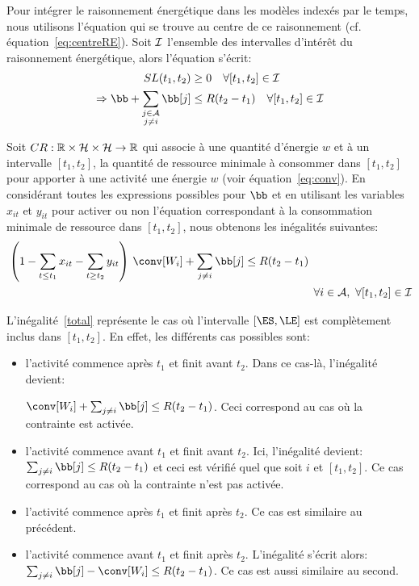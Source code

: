 Pour intégrer le raisonnement énergétique dans les modèles indexés par
le temps, nous utilisons l'équation qui se trouve au centre de ce
raisonnement (cf. équation~\ref{eq:centreRE}). Soit ${\cal I}$ l'ensemble des
intervalles d'intérêt du raisonnement énergétique, alors l'équation
s'écrit:  
\begin{align} 
  SL(t_1,t_2) &\ge 0 \quad \forall [t_1,t_2] \in \I \nonumber\\
  \Rightarrow \bb + \sum_{\substack{j\in \A\\j\neq i}}\bb[j] &\le
  R(t_2-t_1)\quad \forall [t_1,t_2] \in \I \nonumber
\end{align}  

Soit $CR: \mathbb{R} \times {\cal H} \times {\cal H} \rightarrow \mathbb{R}$ qui
associe à une quantité d'énergie $w$ et à un intervalle $[t_1,t_2]$,
la quantité de ressource minimale à consommer dans $[t_1,t_2]$ pour
apporter à une activité une énergie $w$ (voir
équation~\eqref{eq:conv}). En considérant toutes les
expressions possibles pour $\bb$ et en utilisant les variables
$x_{it}$ et $y_{it}$ pour activer ou non l'équation correspondant à la
consommation minimale de ressource dans $[t_1,t_2]$, nous obtenons les
inégalités suivantes: 
\begin{align}
  &\left(1-\sum_{t\le t_1}x_{it} - \sum_{t\ge t_2}y_{it}\right) \, \conv[W_i] +
    \sum_{j\neq i} \bb[j] \le R(t_2-t_1) \nonumber\\
  & \hspace{9.55cm} \forall i \in \A,\ \forall [t_1,t_2] \in \I
    \label{total}
\end{align}

L'inégalité~\eqref{total} représente le cas où l'intervalle
$[\ES,\LE]$ est complètement inclus dans $[t_1,t_2]$. En effet,
les différents cas possibles sont: 
\begin{itemize}
\item l'activité commence après $t_1$ et finit avant $t_2$. Dans ce
  cas-là, l'inégalité devient: 

$\conv[W_i] +\sum_{j\neq i} \bb[j] \le
  R(t_2-t_1)$. Ceci correspond au cas où la contrainte est activée. 
\item l'activité commence avant $t_1$ et finit avant $t_2$. Ici,
  l'inégalité devient: $\sum_{j\neq i} \bb[j] \le R(t_2-t_1)$ et ceci
  est vérifié quel que soit $i$ et $[t_1,t_2]$. Ce cas correspond au
  cas où la contrainte n'est pas activée. 
\item l'activité commence après $t_1$ et finit après $t_2$. Ce cas est
  similaire au précédent. 
\item l'activité commence avant $t_1$ et finit après
  $t_2$. L'inégalité s'écrit alors: $\sum_{j\neq i} \bb[j]-\conv[W_i]
  \le R(t_2-t_1)$. Ce cas est aussi similaire au second. 
\end{itemize}

